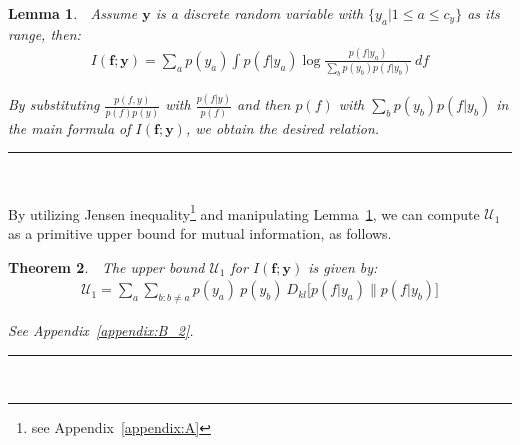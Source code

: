 \documentclass[10pt,journal,compsoc]{IEEEtran}
\newcommand{\BlackBox}{\rule{1.5ex}{1.5ex}}  %
\newenvironment{proof}{\par\noindent{\bf Proof\ }}{\hfill\BlackBox\\[2mm]}
\newtheorem{theorem}{Theorem}
\newtheorem{lemma}[theorem]{Lemma}
\begin{document}
\begin{lemma}
	\label{lem1}
	$\;$ Assume $\textbf{y}$ is a discrete random variable with $\{y_a|1\le a \le c_y\}$ as its range, then:
	\begin{align*}
	I(\textbf{f};\textbf{y}) = \sum_a p(y_a) \int p(f|y_a) \log \frac{p(f|y_a)}{\sum_b p(y_b)p(f|y_b)}\ df
	\end{align*} 
	\begin{proof}
		By substituting $\frac{p(f,y)}{p(f)p(y)}$ with $\frac{p(f|y)}{p(f)}$ and then $p(f)$ with $\sum_b p(y_b)p(f|y_b)$ in the main formula of $I(\textbf{f};\textbf{y})$, we obtain the desired relation.
	\end{proof}
\end{lemma}

By utilizing Jensen inequality\footnote{see Appendix~\ref{appendix:A}} and manipulating Lemma~\ref{lem1}, we can compute $\mathcal{U}_1$ as a primitive upper bound for mutual information, as follows.
\begin{theorem} \label{th1}
	$\;$ The upper bound $\mathcal{U}_1$ for $I(\textbf{f};\textbf{y})$ is given by:
	\begin{align}
	\mathcal{U}_1 = \sum_a \sum_{b: b\neq a} p(y_a)\ p(y_b)\ D_{kl} \big[ p(f|y_a) \| p(f|y_b) \big]
	\end{align}
	\begin{proof}
		See Appendix~\ref{appendix:B_2}.
	\end{proof}
\end{theorem}%
\end{document}
